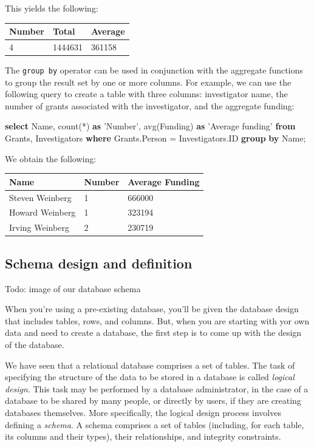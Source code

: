 \documentclass[]{krantz}
\newenvironment{Shaded}{\begin{snugshade}}{\end{snugshade}}
\newcommand{\KeywordTok}[1]{\textcolor[rgb]{0.13,0.29,0.53}{\textbf{#1}}}
\newcommand{\StringTok}[1]{\textcolor[rgb]{0.31,0.60,0.02}{#1}}
\newcommand{\FunctionTok}[1]{\textcolor[rgb]{0.00,0.00,0.00}{#1}}
\newcommand{\NormalTok}[1]{#1}
\begin{document}
This yields the following:

\begin{longtable}[]{@{}lll@{}}
\toprule
\textbf{Number} & \textbf{Total} & \textbf{Average}\tabularnewline
\midrule
\endhead
4 & 1444631 & 361158\tabularnewline
\bottomrule
\end{longtable}

The \texttt{group\ by} operator can be used in conjunction with the
aggregate functions to group the result set by one or more columns. For
example, we can use the following query to create a table with three
columns: investigator name, the number of grants associated with the
investigator, and the aggregate funding:

\begin{Shaded}
\begin{Highlighting}[]
\KeywordTok{select}\NormalTok{ Name, }\FunctionTok{count}\NormalTok{(*) }\KeywordTok{as} \StringTok{'Number'}\NormalTok{,}
       \FunctionTok{avg}\NormalTok{(Funding) }\KeywordTok{as} \StringTok{'Average funding'}
\KeywordTok{from}\NormalTok{ Grants, Investigators}
\KeywordTok{where}\NormalTok{ Grants.Person = Investigators.ID}
\KeywordTok{group} \KeywordTok{by}\NormalTok{ Name;}
\end{Highlighting}
\end{Shaded}

We obtain the following:

\begin{longtable}[]{@{}lll@{}}
\toprule
\textbf{Name} & \textbf{Number} & \textbf{Average
Funding}\tabularnewline
\midrule
\endhead
Steven Weinberg & 1 & 666000\tabularnewline
Howard Weinberg & 1 & 323194\tabularnewline
Irving Weinberg & 2 & 230719\tabularnewline
\bottomrule
\end{longtable}

\hypertarget{sec:db:schema}{\subsection{Schema design and
definition}\label{sec:db:schema}}

Todo: image of our database schema

When you're using a pre-existing database, you'll be given the database
design that includes tables, rows, and columns. But, when you are
starting with yor own data and need to create a database, the first step
is to come up with the design of the database.

We have seen that a relational database comprises a set of tables. The
task of specifying the structure of the data to be stored in a database
is called \emph{logical design}. This task may be performed by a
database administrator, in the case of a database to be shared by many
people, or directly by users, if they are creating databases themselves.
More specifically, the logical design process involves defining a
\emph{schema}. A schema comprises a set of tables (including, for each
table, its columns and their types), their relationships, and integrity
constraints.
\end{document}

